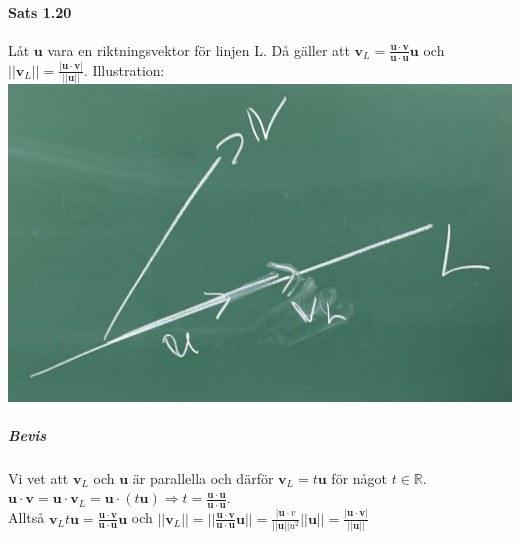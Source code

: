    \paragraph{Sats 1.20} Låt $\bm{u}$ vara en riktningsvektor för linjen L.
    Då gäller att $\bm{v}_{L} = \frac{\bm{u}\cdot \bm{v}}{\bm{u}\cdot \bm{u}}\bm{u}$ och $||\bm{v}_{L}||=\frac{|\bm{u}\cdot \bm{v}|}{||\bm{u}||}$.
    Illustration: \\
    \includegraphics[scale=0.10]{imgs/22-01-20-img05.jpg}
    \subparagraph{Bevis} Vi vet att $\bm{v}_{L}$ och $\bm{u}$ är parallella och därför $\bm{v}_{L}=t\bm{u}$ för något $t\in \mathbb{R}$.
    $\bm{u}\cdot \bm{v}=\bm{u}\cdot \bm{v}_{L}=\bm{u}\cdot (t\bm{u}) \Rightarrow t=\frac{\bm{u}\cdot \bm{u}}{\bm{u}\cdot \bm{u}}$.
    \\Alltså
    $\bm{v}_{L}t\bm{u}=\frac{\bm{u}\cdot \bm{v}}{\bm{u}\cdot \bm{u}}\bm{u}$ och
    $||\bm{v}_{L}||=||\frac{\bm{u}\cdot \bm{v}}{\bm{u}\cdot \bm{u}}\bm{u}||=\frac{|\bm{u}\cdot v}{||\bm{u}||u^{2}}||\bm{u}||=\frac{|\bm{u}\cdot \bm{v}|}{||\bm{u}||}$
    

